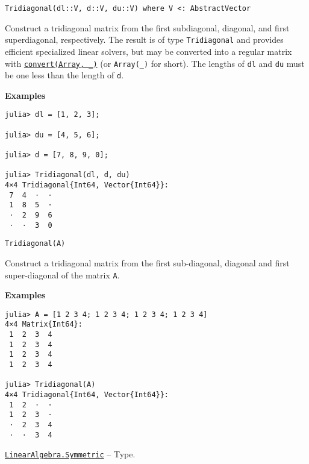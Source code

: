 \begin{adjustwidth}{2em}{0pt}


\begin{verbatim}
Tridiagonal(dl::V, d::V, du::V) where V <: AbstractVector
\end{verbatim}

Construct a tridiagonal matrix from the first subdiagonal, diagonal, and first superdiagonal, respectively. The result is of type \texttt{Tridiagonal} and provides efficient specialized linear solvers, but may be converted into a regular matrix with \hyperlink{1846942650946171605}{\texttt{convert(Array, \_)}} (or \texttt{Array(\_)} for short). The lengths of \texttt{dl} and \texttt{du} must be one less than the length of \texttt{d}.

\textbf{Examples}


\begin{verbatim}
julia> dl = [1, 2, 3];

julia> du = [4, 5, 6];

julia> d = [7, 8, 9, 0];

julia> Tridiagonal(dl, d, du)
4×4 Tridiagonal{Int64, Vector{Int64}}:
 7  4  ⋅  ⋅
 1  8  5  ⋅
 ⋅  2  9  6
 ⋅  ⋅  3  0
\end{verbatim}




\begin{lstlisting}
Tridiagonal(A)
\end{lstlisting}

Construct a tridiagonal matrix from the first sub-diagonal, diagonal and first super-diagonal of the matrix \texttt{A}.

\textbf{Examples}


\begin{verbatim}
julia> A = [1 2 3 4; 1 2 3 4; 1 2 3 4; 1 2 3 4]
4×4 Matrix{Int64}:
 1  2  3  4
 1  2  3  4
 1  2  3  4
 1  2  3  4

julia> Tridiagonal(A)
4×4 Tridiagonal{Int64, Vector{Int64}}:
 1  2  ⋅  ⋅
 1  2  3  ⋅
 ⋅  2  3  4
 ⋅  ⋅  3  4
\end{verbatim}



\end{adjustwidth}
\hypertarget{17683454167504168761}{}
\hyperlink{17683454167504168761}{\texttt{LinearAlgebra.Symmetric}}  -- {Type.}

